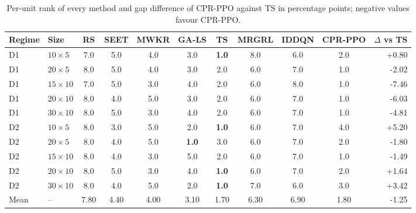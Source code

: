 \begin{table}[!t]
\caption{Per-unit rank of every method and gap difference of CPR-PPO against TS in percentage points; negative values favour CPR-PPO.}
\label{tab:S-ranks}
\centering
\scriptsize
\setlength{\tabcolsep}{6pt}
\begin{tabular}{@{}llccccccccr@{}}
\toprule
Regime & Size & RS & SEET & MWKR & GA-LS & TS & MRGRL & IDDQN & CPR-PPO & $\Delta$ vs TS\\
\midrule
D1 & $10\times5$ & 7.0 & 5.0 & 4.0 & 3.0 & \textbf{1.0} & 8.0 & \cellcolor{bestblue}6.0 & 2.0 & +0.80\\
D1 & $20\times5$ & 8.0 & 5.0 & 4.0 & 3.0 & 2.0 & 6.0 & \cellcolor{bestblue}7.0 & 1.0 & -2.02\\
D1 & $15\times10$ & 7.0 & 5.0 & 3.0 & 4.0 & 2.0 & 6.0 & \cellcolor{bestblue}8.0 & 1.0 & -7.46\\
D1 & $20\times10$ & 8.0 & 4.0 & 5.0 & 3.0 & 2.0 & 6.0 & \cellcolor{bestblue}7.0 & 1.0 & -6.03\\
D1 & $30\times10$ & 8.0 & 5.0 & 3.0 & 4.0 & 2.0 & 6.0 & \cellcolor{bestblue}7.0 & 1.0 & -4.81\\
D2 & $10\times5$ & 8.0 & 3.0 & 5.0 & 2.0 & \textbf{1.0} & 6.0 & \cellcolor{bestblue}7.0 & 4.0 & +5.20\\
D2 & $20\times5$ & 8.0 & 4.0 & 5.0 & \textbf{1.0} & 3.0 & 6.0 & \cellcolor{bestblue}7.0 & 2.0 & -1.80\\
D2 & $15\times10$ & 8.0 & 4.0 & 3.0 & 5.0 & 2.0 & 6.0 & \cellcolor{bestblue}7.0 & 1.0 & -1.49\\
D2 & $20\times10$ & 8.0 & 5.0 & 3.0 & 4.0 & \textbf{1.0} & 6.0 & \cellcolor{bestblue}7.0 & 2.0 & +1.64\\
D2 & $30\times10$ & 8.0 & 4.0 & 5.0 & 2.0 & \textbf{1.0} & 7.0 & \cellcolor{bestblue}6.0 & 3.0 & +3.42\\
\midrule
Mean & -- & 7.80 & 4.40 & 4.00 & 3.10 & 1.70 & 6.30 & 6.90 & 1.80 & -1.25\\
\bottomrule
\end{tabular}
\end{table}

